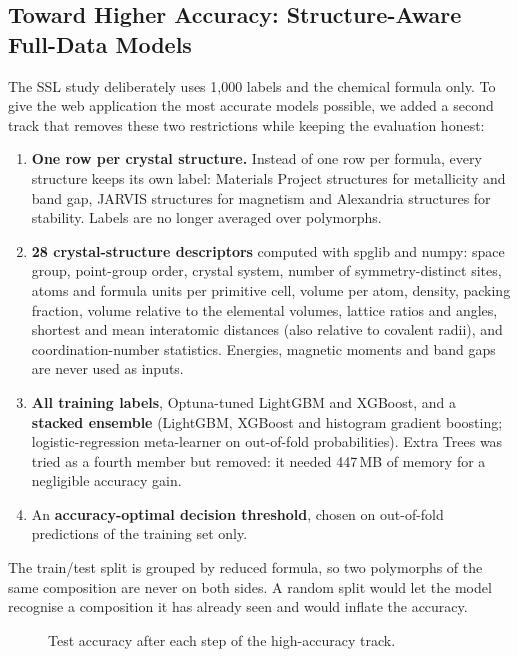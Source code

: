 \subsection*{Toward Higher Accuracy: Structure-Aware Full-Data Models}

The SSL study deliberately uses 1,000 labels and the chemical formula only. To give the web
application the most accurate models possible, we added a second track that removes these
two restrictions while keeping the evaluation honest:
\begin{enumerate}
  \item \textbf{One row per crystal structure.} Instead of one row per formula, every
  structure keeps its own label: \HAMetalNStruct{} Materials Project structures for
  metallicity and band gap, \HAMagNStruct{} JARVIS structures for magnetism and
  \HAStabNStruct{} Alexandria structures for stability. Labels are no longer averaged over
  polymorphs.
  \item \textbf{28 crystal-structure descriptors} computed with spglib and numpy: space group,
  point-group order, crystal system, number of symmetry-distinct sites, atoms and formula units
  per primitive cell, volume per atom, density, packing fraction, volume relative to the
  elemental volumes, lattice ratios and angles, shortest and mean interatomic distances (also
  relative to covalent radii), and coordination-number statistics. Energies, magnetic moments
  and band gaps are never used as inputs.
  \item \textbf{All training labels}, Optuna-tuned LightGBM and XGBoost, and a
  \textbf{stacked ensemble} (LightGBM, XGBoost and histogram gradient boosting;
  logistic-regression meta-learner on out-of-fold probabilities). Extra Trees was tried as a
  fourth member but removed: it needed 447\,MB of memory for a negligible accuracy gain.
  \item An \textbf{accuracy-optimal decision threshold}, chosen on out-of-fold predictions of
  the training set only.
\end{enumerate}
The train/test split is grouped by reduced formula, so two polymorphs of the same composition
are never on both sides. A random split would let the model recognise a composition it has
already seen and would inflate the accuracy.


\begin{figure}[H]
  \centering
  \caption{Test accuracy after each step of the high-accuracy track.}\label{fig:hiacc}
\end{figure}

